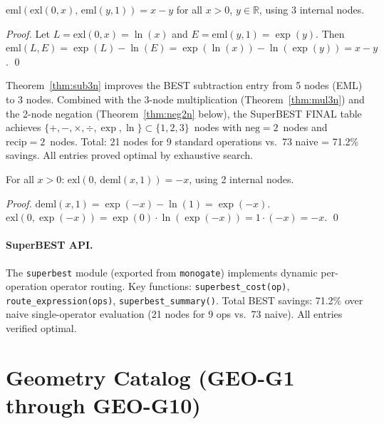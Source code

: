 \begin{theorem}
\label{thm:sub3n}
$\mathrm{eml}(\mathrm{exl}(0, x),\, \mathrm{eml}(y, 1)) = x - y$
for all $x > 0$, $y \in \mathbb{R}$, using 3 internal nodes.
\end{theorem}

\begin{proof}
Let $L = \mathrm{exl}(0, x) = \ln(x)$ and $E = \mathrm{eml}(y, 1) = \exp(y)$.
Then $\mathrm{eml}(L, E) = \exp(L) - \ln(E) = \exp(\ln(x)) - \ln(\exp(y)) = x - y$. \qed
\end{proof}

\begin{remark}
Theorem~\ref{thm:sub3n} improves the BEST subtraction entry from 5 nodes (EML)
to 3 nodes. Combined with the 3-node multiplication (Theorem~\ref{thm:mul3n})
and the 2-node negation (Theorem~\ref{thm:neg2n} below),
the SuperBEST FINAL table achieves $\{+,-,\times,\div,\exp,\ln\} \subset \{1,2,3\}$~nodes
with $\mathrm{neg} = 2$~nodes and $\mathrm{recip} = 2$~nodes.
Total: 21 nodes for 9 standard operations vs.\ 73 naive = 71.2\% savings.
All entries proved optimal by exhaustive search.
\end{remark}

\begin{theorem}
\label{thm:neg2n}
For all $x > 0$: $\mathrm{exl}(0,\, \mathrm{deml}(x, 1)) = -x$, using 2 internal nodes.
\end{theorem}

\begin{proof}
$\mathrm{deml}(x,1) = \exp(-x) - \ln(1) = \exp(-x)$.
$\mathrm{exl}(0, \exp(-x)) = \exp(0) \cdot \ln(\exp(-x)) = 1 \cdot (-x) = -x$. \qed
\end{proof}

\paragraph{SuperBEST API.} The \texttt{superbest} module (exported from
\texttt{monogate}) implements dynamic per-operation operator routing.
Key functions: \texttt{superbest\_cost(op)}, \texttt{route\_expression(ops)},
\texttt{superbest\_summary()}.
Total BEST savings: 71.2\% over naive single-operator evaluation
(21 nodes for 9 ops vs.\ 73 naive). All entries verified optimal.

\section{Geometry Catalog (GEO-G1 through GEO-G10)}

